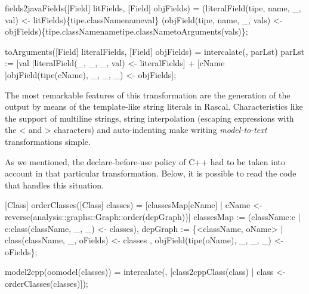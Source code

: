 \documentclass[submission,copyright,creativecommons]{eptcs}
\begin{document}
\begin{rascal}
 fields2javaFields([Field] litFields, [Field] objFields) =
     (literalField(tipe, name, \_{}, val) \textless{}- litFields)\{{}tipe.classNamenameval\}{} (objField(tipe, name, \_{}, vals) \textless{}- objFields)\{{}tipe.classNamenametipe.classNametoArguments(vals)\}{};

 toArguments([Field] literalFields, [Field] objFields) =
    intercalate(, parLst)
     parLst := {}[val |literalField(\_{}, \_{}, \_{},  val) \textless{}- literalFields]
                   + {}[cName |objField(tipe(cName), \_{}, \_{}, \_{}) \textless{}- objFields];
\end{rascal}

The most remarkable features of this transformation are the generation of the output by means of the template-like string literals in Rascal. Characteristics like the support of multiline strings, string interpolation (escaping expressions with the < and > characters) and auto-indenting make writing \emph{model-to-text} transformations simple.

As we mentioned, the declare-before-use policy of C++ had to be taken into account in that particular transformation. Below, it is possible to read the code that handles this situation.

\begin{rascal}
[Class] orderClasses([Class] classes) =
    {}[classesMap{}[cName] | cName \textless{}- reverse(analysis::graphs::Graph::order(depGraph))]
     classesMap := (className:c | c:class(className, \_{}, \_{}) \textless{}- classes),
         depGraph := \{{}\textless{}className, oName\textgreater{} | class(className, \_{}, oFields) \textless{}- classes
                                         , objField(tipe(oName), \_{}, \_{}, \_{}) \textless{}- oFields\}{};

 model2cpp(oomodel(classes)) = 
    intercalate(, {}[class2cppClass(class) | class \textless{}- orderClasses(classes)]);
\end{rascal}
\end{document}
